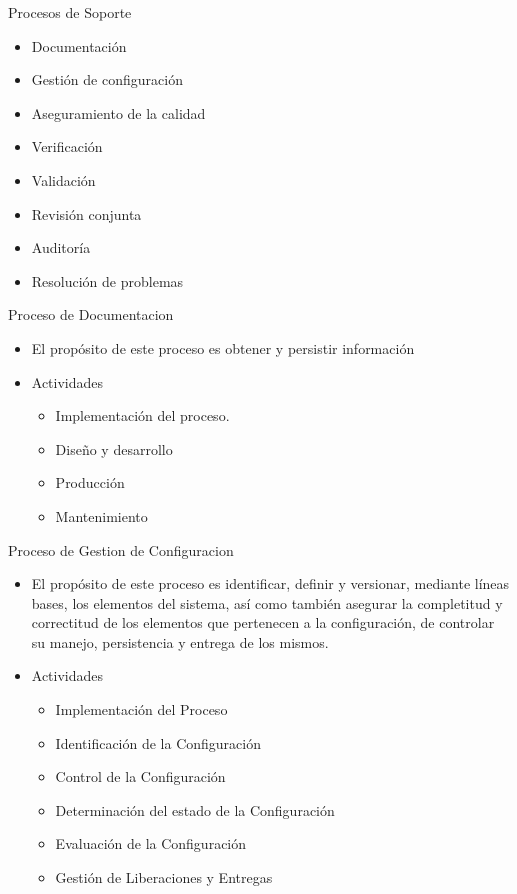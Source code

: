 \documentclass{beamer}
\begin{document}
			\begin{frame}{Procesos de Soporte}
				\begin{itemize}
					\item Documentación
					\item Gestión de configuración
					\item Aseguramiento de la calidad
					\item Verificación
					\item Validación
					\item Revisión conjunta
					\item Auditoría
					\item Resolución de problemas
				\end{itemize}
			\end{frame}
			
			\begin{frame}{Proceso de Documentacion}
				\begin{itemize}
					\item El propósito de este proceso es obtener y persistir información
					\item Actividades
					\begin{itemize}
						\item Implementación del proceso.
						\item Diseño y desarrollo
						\item Producción
						\item Mantenimiento
					\end{itemize}
				\end{itemize} 
			\end{frame}
			
			\begin{frame}{Proceso de Gestion de Configuracion}
				\begin{itemize}
					\item El propósito de este proceso es identificar, definir y versionar, mediante líneas bases, los elementos del sistema, así como también asegurar la completitud y correctitud de los elementos que pertenecen a la configuración, de controlar su manejo, persistencia y entrega de los mismos.
					\item Actividades
			
					\begin{itemize}
						\item Implementación del Proceso
						\item Identificación de la Configuración
						\item Control de la Configuración
						\item Determinación del estado de la Configuración
						\item Evaluación de la Configuración
						\item Gestión de Liberaciones y Entregas
					\end{itemize}
			
				\end{itemize}
			
			\end{frame}
			
\end{document}
